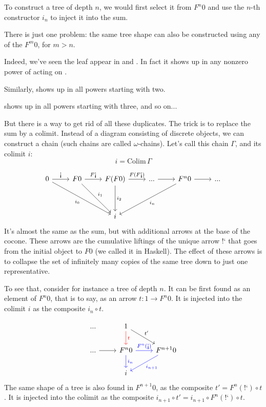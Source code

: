 \documentclass[DaoFP]{subfiles}
\begin{document}
To construct a tree of depth $n$, we would first select it from $F^n 0$ and use the $n$-th constructor $i_n$ to inject it into the sum. 

There is just one problem: the same tree shape can also be constructed using any of the $F^m 0$, for $m > n$. 

Indeed, we've seen the leaf  appear in  and . In fact it shows up in any nonzero power of  acting on . 

Similarly,  shows up in all powers starting with two.

 shows up in all powers starting with three, and so on...

But there is a way to get rid of all these duplicates. The trick is to replace the sum by a colimit. Instead of a diagram consisting of discrete objects, we can construct a chain (such chains are called $\omega$-chains). Let's call this chain $\Gamma$, and its colimit $i$:
\[i = \text{Colim} \, \Gamma \]

\[
 \begin{tikzcd}
 0
 \arrow[r, "\mbox{!`}"]
 \arrow[ddrr, "i_0"']
 & F 0
  \arrow[r, "F\mbox{!`}"]
 \arrow[ddr, "i_1"]
& F (F 0)
  \arrow[r, "F(F\mbox{!`})"]
  \arrow[dd, "i_2"]
 & ...
 \arrow[r]
 & F^n 0
  \arrow[r]
 \arrow[ddll, "i_n"]
 & ...
 \\
 \\
 &&i
  \end{tikzcd}
\]
It's almost the same as the sum, but with additional arrows at the base of the cocone. These arrows are the cumulative liftings of the unique arrow $\mbox{!`}$ that goes from the initial object to $F 0$ (we called it  in Haskell). The effect of these arrows is to collapse the set of infinitely many copies of the same tree down to just one representative. 

To see that, consider for instance a tree of depth $n$. It can be first found as an element of $F^n 0$, that is to say, as an arrow $t \colon 1 \to F^n 0$. It is injected into the colimit $i$ as the composite $i_n \circ t$. 

\[
 \begin{tikzcd}
 ...
& 1
\arrow[d, red, "t"]
\arrow[dr, "t'"]
 \\
 ...
 \arrow[r]
 & F^n 0 
 \arrow[r,  blue, "F^n (\mbox{!`})"]
 \arrow[d, blue, "i_n"]
 & F^{n+1} 0
 \arrow[dl, blue, "i_{n+1}"]
 \\
 &  i
  \end{tikzcd}
\]
The same shape of a tree is also found in $F^{n+1} 0$, as the composite $t' = F^n (\mbox{!`}) \circ t$. It is injected into the colimit as the composite $i_{n+1} \circ t' = i_{n+1} \circ F^n (\mbox{!`}) \circ t$. 
\end{document}
